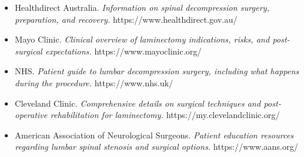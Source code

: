 \begin{itemize}
    \item Healthdirect Australia. \textit{Information on spinal decompression surgery, preparation, and recovery.} https://www.healthdirect.gov.au/
    \item Mayo Clinic. \textit{Clinical overview of laminectomy indications, risks, and post-surgical expectations.} https://www.mayoclinic.org/
    \item NHS. \textit{Patient guide to lumbar decompression surgery, including what happens during the procedure.} https://www.nhs.uk/
    \item Cleveland Clinic. \textit{Comprehensive details on surgical techniques and post-operative rehabilitation for laminectomy.} https://my.clevelandclinic.org/
    \item American Association of Neurological Surgeons. \textit{Patient education resources regarding lumbar spinal stenosis and surgical options.} https://www.aans.org/
\end{itemize}
